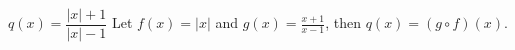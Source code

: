 {$q(x) = \dfrac{|x|+1}{|x|-1}$}
{Let $f(x) = |x|$ and $g(x) = \frac{x+1}{x-1}$, then  $q(x) =(g\circ f)(x)$.}

